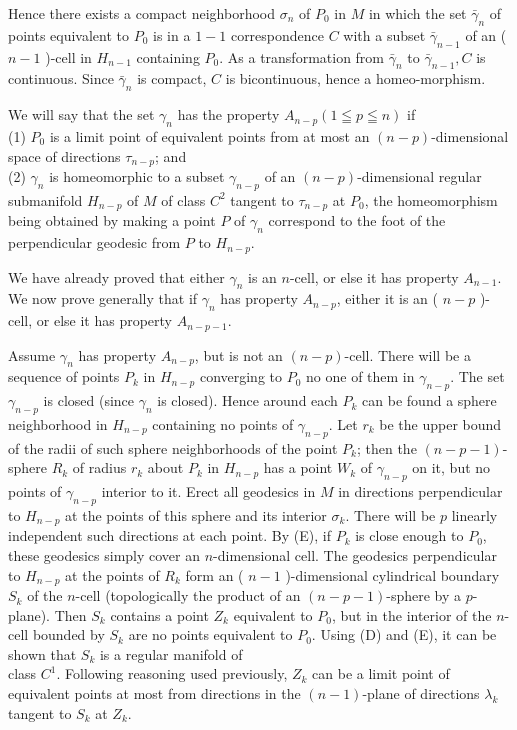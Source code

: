 \documentclass[10pt]{article}
\begin{document}
Hence there exists a compact neighborhood $\sigma_{n}$ of $P_{0}$ in $M$ in which the set $\bar{\gamma}_{n}$ of points equivalent to $P_{0}$ is in a $1-1$ correspondence $C$ with a subset $\bar{\gamma}_{n-1}$ of an ( $n-1$ )-cell in $H_{n-1}$ containing $P_{0}$. As a transformation from $\bar{\gamma}_{n}$ to $\bar{\gamma}_{n-1}, C$ is continuous. Since $\bar{\gamma}_{n}$ is compact, $C$ is bicontinuous, hence a homeo-morphism.

We will say that the set $\gamma_{n}$ has the property $A_{n-p}(1 \leqq p \leqq n)$ if\\
(1) $P_{0}$ is a limit point of equivalent points from at most an $(n-p)$-dimensional space of directions $\tau_{n-p}$; and\\
(2) $\gamma_{n}$ is homeomorphic to a subset $\gamma_{n-p}$ of an $(n-p)$-dimensional regular submanifold $H_{n-p}$ of $M$ of class $C^{2}$ tangent to $\tau_{n-p}$ at $P_{0}$, the homeomorphism being obtained by making a point $P$ of $\gamma_{n}$ correspond to the foot of the perpendicular geodesic from $P$ to $H_{n-p}$.

We have already proved that either $\gamma_{n}$ is an $n$-cell, or else it has property $A_{n-1}$. We now prove generally that if $\gamma_{n}$ has property $A_{n-p}$, either it is an ( $n-p$ )-cell, or else it has property $A_{n-p-1}$.

Assume $\gamma_{n}$ has property $A_{n-p}$, but is not an $(n-p)$-cell. There will be a sequence of points $P_{k}$ in $H_{n-p}$ converging to $P_{0}$ no one of them in $\gamma_{n-p}$. The set $\gamma_{n-p}$ is closed (since $\gamma_{n}$ is closed). Hence around each $P_{k}$ can be found a sphere neighborhood in $H_{n-p}$ containing no points of $\gamma_{n-p}$. Let $r_{k}$ be the upper bound of the radii of such sphere neighborhoods of the point $P_{k}$; then the $(n-p-1)$-sphere $R_{k}$ of radius $r_{k}$ about $P_{k}$ in $H_{n-p}$ has a point $W_{k}$ of $\gamma_{n-p}$ on it, but no points of $\gamma_{n-p}$ interior to it. Erect all geodesics in $M$ in directions perpendicular to $H_{n-p}$ at the points of this sphere and its interior $\sigma_{k}$. There will be $p$ linearly independent such directions at each point. By (E), if $P_{k}$ is close enough to $P_{0}$, these geodesics simply cover an $n$-dimensional cell. The geodesics perpendicular to $H_{n-p}$ at the points of $R_{k}$ form an ( $n-1$ )-dimensional cylindrical boundary $S_{k}$ of the $n$-cell (topologically the product of an $(n-p-1)$-sphere by a $p$-plane). Then $S_{k}$ contains a point $Z_{k}$ equivalent to $P_{0}$, but in the interior of the $n$-cell bounded by $S_{k}$ are no points equivalent to $P_{0}$. Using (D) and (E), it can be shown that $S_{k}$ is a regular manifold of\\
class $C^{1}$. Following reasoning used previously, $Z_{k}$ can be a limit point of equivalent points at most from directions in the $(n-1)$-plane of directions $\lambda_{k}$ tangent to $S_{k}$ at $Z_{k}$.
\end{document}
